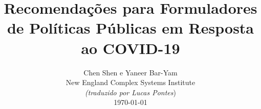 \documentclass[onecolumn,journal]{IEEEtran}
\begin{document}
\title{\color{Brown}  Recomendações para Formuladores de Políticas Públicas em Resposta ao COVID-19
\vspace{-0.35ex}}
\author{Chen Shen e Yaneer Bar-Yam \\ New England Complex Systems Institute \\
\vspace{+0.35ex}
\small{\textit{(traduzido por Lucas Pontes})}\\
 \today
  \vspace{-8ex} \\
\textbf{}
 }

\maketitle




\thispagestyle{empty} %




\end{document}
